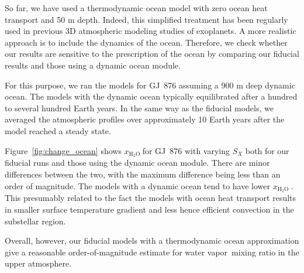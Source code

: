 \documentclass[11pt,numberedappendix,twocolappendix,]{emulateapj}
\def\water{H$_2$O }
\def\xwater{$x_\text{\water}$}
\def\memo#1{\color{red}$[${\bf #1}$]$ \color{black}}
\newcommand{\dsa}[1]{{\color{blue}#1}}
\newcommand{\yf}[1]{{\color{orange}#1}}
\newcommand{\wv}{water vapor\ }
\begin{document}
So far, we have used a thermodynamic ocean model with zero ocean heat transport and 50 m depth. 
Indeed, this simplified treatment has been regularly used in \yf{previous 3D atmospheric modeling studies of exoplanets}. 
A more realistic approach is to include the dynamics of the ocean. 
Therefore, we check whether our results are sensitive to the prescription of the ocean by comparing our fiducial results and those using a dynamic ocean module. 

For this purpose, we ran the models for GJ~876 assuming a 900 m deep dynamic ocean. 
The models with the dynamic ocean typically equilibrated after a hundred to several hundred Earth years. 
In the same way as the fiducial models, we averaged the atmospheric profiles  over approximately 10 Earth years after the model reached a steady state. 

Figure~\ref{fig:change_ocean} shows \xwater for GJ~876 with varying $S_X$ both for our fiducial runs and those using the dynamic ocean module.  
\yf{There are minor differences between the two, with the maximum difference being less than an order of magnitude. }
\yf{The models with a dynamic ocean tend to have lower \xwater. 
This presumably related to the fact the models with ocean heat transport results in smaller surface temperature gradient and less hence efficient convection in the substellar region. }


Overall, however, our fiducial models with a thermodynamic ocean approximation give a reasonable order-of-magnitude estimate for \wv mixing ratio in the upper atmosphere. 
\end{document}
